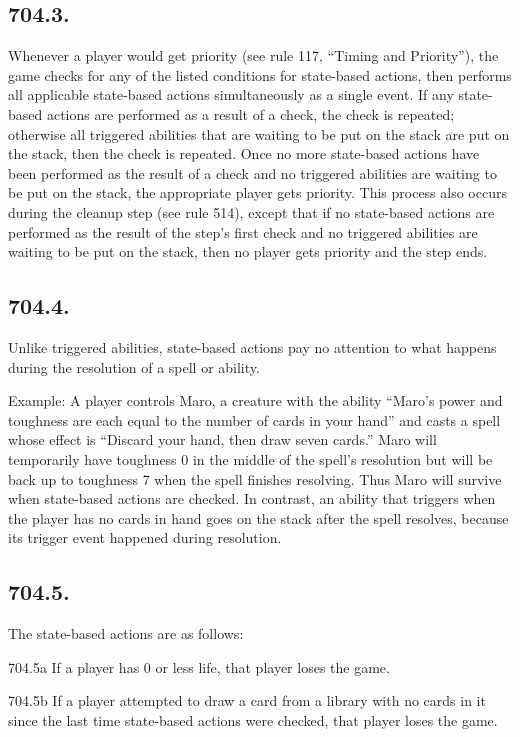 \subsection*{704.3.}
Whenever a player would get priority (see rule 117, “Timing and Priority”), the game checks for any of the listed conditions for state-based actions, then performs all applicable state-based actions simultaneously as a single event. If any state-based actions are performed as a result of a check, the check is repeated; otherwise all triggered abilities that are waiting to be put on the stack are put on the stack, then the check is repeated. Once no more state-based actions have been performed as the result of a check and no triggered abilities are waiting to be put on the stack, the appropriate player gets priority. This process also occurs during the cleanup step (see rule 514), except that if no state-based actions are performed as the result of the step’s first check and no triggered abilities are waiting to be put on the stack, then no player gets priority and the step ends.

\subsection*{704.4.}
Unlike triggered abilities, state-based actions pay no attention to what happens during the resolution of a spell or ability.

Example: A player controls Maro, a creature with the ability “Maro’s power and toughness are each equal to the number of cards in your hand” and casts a spell whose effect is “Discard your hand, then draw seven cards.” Maro will temporarily have toughness 0 in the middle of the spell’s resolution but will be back up to toughness 7 when the spell finishes resolving. Thus Maro will survive when state-based actions are checked. In contrast, an ability that triggers when the player has no cards in hand goes on the stack after the spell resolves, because its trigger event happened during resolution.

\subsection*{704.5.}
The state-based actions are as follows:

704.5a If a player has 0 or less life, that player loses the game.

704.5b If a player attempted to draw a card from a library with no cards in it since the last time state-based actions were checked, that player loses the game.

